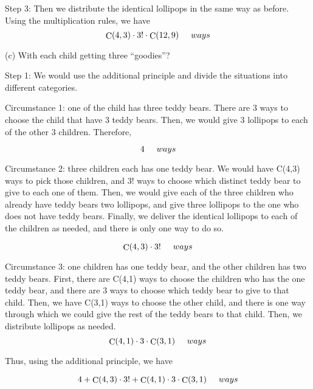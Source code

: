 \documentclass[12pt]{amsart}
\DeclareMathOperator{\comb}{C}
\begin{document}
Step 3: Then we distribute the identical lollipops in the same way as before. Using the multiplication rules, we have 
\begin{displaymath}
\comb (4,3)\cdot3!\cdot\comb (12,9) \hspace{0.5cm}   ways
\end{displaymath}

\smallskip
(c) With each child getting three “goodies”?
\smallskip

Step 1: We would use the additional principle and divide the situations into different categories.
\smallskip

Circumstance 1: one of the child has three teddy bears. There are 3 ways to choose the child that have 3 teddy bears. Then, we would give 3 lollipops to each of the other 3 children. Therefore,

\begin{displaymath}
4  \hspace{0.5cm} ways
\end{displaymath}
\smallskip

Circumstance 2: three children each has one teddy bear. We would have C(4,3) ways to pick those children, and 3! ways to choose which distinct teddy bear to give to each one of them. Then, we would give each of the three children who already have teddy bears two lollipops, and give three lollipops to the one who does not have teddy bears. Finally, we deliver the identical lollipops to each of the children as needed, and there is only one way to do so.

\begin{displaymath}
\comb (4,3)\cdot3! \hspace{0.5cm}   ways
\end{displaymath}

Circumstance 3: one children has one teddy bear, and the other children has two teddy bears. First, there are C(4,1) ways to choose the children who has the one teddy bear, and there are 3 ways to choose which teddy bear to give to that child. Then, we have C(3,1) ways to choose the other child, and there is one way through which we could give the rest of the teddy bears to that child. Then, we distribute lollipops as needed.
\begin{displaymath}
\comb (4,1)\cdot3\cdot\comb (3,1)\hspace{0.5cm}   ways
\end{displaymath}
\smallskip

Thus, using the additional principle, we have

\begin{displaymath}
4+\comb (4,3)\cdot3!+\comb (4,1)\cdot3\cdot\comb (3,1)\hspace{0.5cm}   ways
\end{displaymath}
\smallskip
\end{document}
